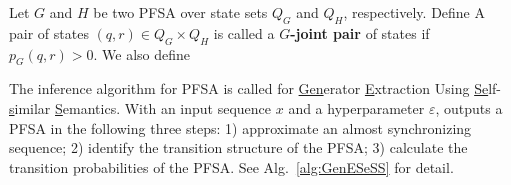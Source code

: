 \begin{defn}
Let $G$ and $H$ be two PFSA over state sets $Q_{G}$ and $Q_H$, respectively. Define
A pair of states $(q,r)\in Q_G\times Q_H$ is called a \textbf{$G$-joint pair} of states if $p_{G}(q,r) > 0$. We also define
\end{defn}


The inference algorithm for PFSA is called \textbf{\algo} for \underline{Gen}erator \underline{E}xtraction Using \underline{Se}lf-\underline{s}imilar \underline{S}emantics. With an input sequence $x$ and a hyperparameter $\varepsilon$, \algo outputs a PFSA in the following three steps: 1) approximate an almost synchronizing sequence; 2) identify the transition structure of the PFSA; 3) calculate the transition probabilities of the PFSA. See Alg.~\ref{alg:GenESeSS} for detail.

